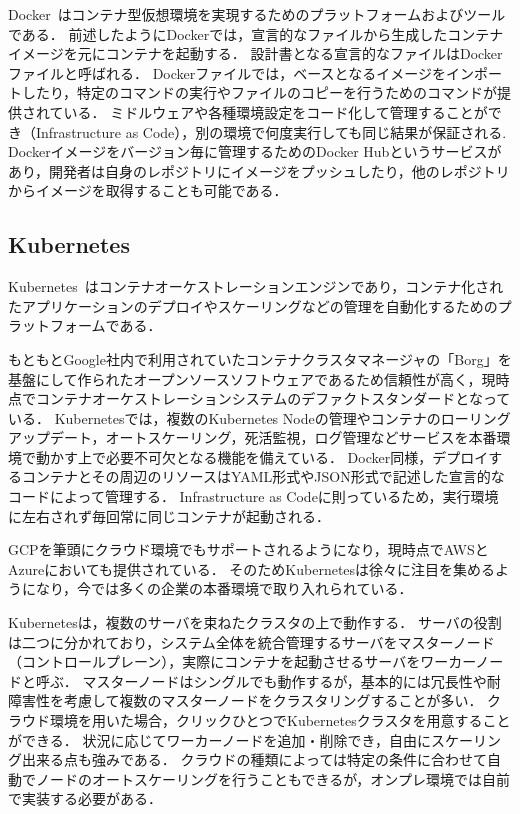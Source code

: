 Docker~\cite{Docker}はコンテナ型仮想環境を実現するためのプラットフォームおよびツールである．
前述したようにDockerでは，宣言的なファイルから生成したコンテナイメージを元にコンテナを起動する．
設計書となる宣言的なファイルはDockerファイルと呼ばれる．
Dockerファイルでは，ベースとなるイメージをインポートしたり，特定のコマンドの実行やファイルのコピーを行うためのコマンドが提供されている．
ミドルウェアや各種環境設定をコード化して管理することができ（Infrastructure as Code），別の環境で何度実行しても同じ結果が保証される.
Dockerイメージをバージョン毎に管理するためのDocker Hubというサービスがあり，開発者は自身のレポジトリにイメージをプッシュしたり，他のレポジトリからイメージを取得することも可能である．

\subsection{Kubernetes}
\label{background:container-orchestration-system:kubernetes}

Kubernetes~\cite{Kubernetes}はコンテナオーケストレーションエンジンであり，コンテナ化されたアプリケーションのデプロイやスケーリングなどの管理を自動化するためのプラットフォームである．

もともとGoogle社内で利用されていたコンテナクラスタマネージャの「Borg」を基盤にして作られたオープンソースソフトウェアであるため信頼性が高く，現時点でコンテナオーケストレーションシステムのデファクトスタンダードとなっている．
Kubernetesでは，複数のKubernetes Nodeの管理やコンテナのローリングアップデート，オートスケーリング，死活監視，ログ管理などサービスを本番環境で動かす上で必要不可欠となる機能を備えている．
Docker同様，デプロイするコンテナとその周辺のリソースはYAML形式やJSON形式で記述した宣言的なコードによって管理する．
Infrastructure as Codeに則っているため，実行環境に左右されず毎回常に同じコンテナが起動される．

GCPを筆頭にクラウド環境でもサポートされるようになり，現時点でAWSとAzureにおいても提供されている．
そのためKubernetesは徐々に注目を集めるようになり，今では多くの企業の本番環境で取り入れられている．

Kubernetesは，複数のサーバを束ねたクラスタの上で動作する．
サーバの役割は二つに分かれており，システム全体を統合管理するサーバをマスターノード（コントロールプレーン），実際にコンテナを起動させるサーバをワーカーノードと呼ぶ．
マスターノードはシングルでも動作するが，基本的には冗長性や耐障害性を考慮して複数のマスターノードをクラスタリングすることが多い．
クラウド環境を用いた場合，クリックひとつでKubernetesクラスタを用意することができる．
状況に応じてワーカーノードを追加・削除でき，自由にスケーリング出来る点も強みである．
クラウドの種類によっては特定の条件に合わせて自動でノードのオートスケーリングを行うこともできるが，オンプレ環境では自前で実装する必要がある．


